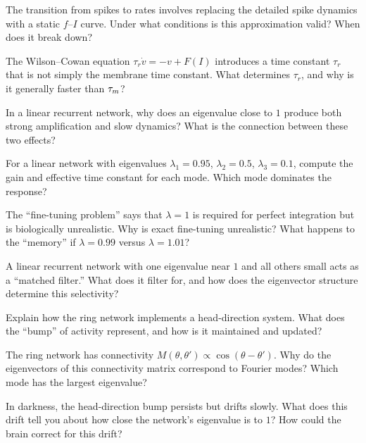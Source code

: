 \begin{conceptquestions}
  \item The transition from spikes to rates involves replacing the detailed spike dynamics with a static $f$--$I$ curve. Under what conditions is this approximation valid? When does it break down?

  \item The Wilson--Cowan equation $\tau_r \dot{v} = -v + F(I)$ introduces a time constant $\tau_r$ that is not simply the membrane time constant. What determines $\tau_r$, and why is it generally faster than $\tau_m$?

  \item In a linear recurrent network, why does an eigenvalue close to $1$ produce both strong amplification and slow dynamics? What is the connection between these two effects?

  \item For a linear network with eigenvalues $\lambda_1 = 0.95$, $\lambda_2 = 0.5$, $\lambda_3 = 0.1$, compute the gain and effective time constant for each mode. Which mode dominates the response?

  \item The ``fine-tuning problem'' says that $\lambda = 1$ is required for perfect integration but is biologically unrealistic. Why is exact fine-tuning unrealistic? What happens to the ``memory'' if $\lambda = 0.99$ versus $\lambda = 1.01$?

  \item A linear recurrent network with one eigenvalue near $1$ and all others small acts as a ``matched filter.'' What does it filter for, and how does the eigenvector structure determine this selectivity?

  \item Explain how the ring network implements a head-direction system. What does the ``bump'' of activity represent, and how is it maintained and updated?

  \item The ring network has connectivity $M(\theta, \theta') \propto \cos(\theta - \theta')$. Why do the eigenvectors of this connectivity matrix correspond to Fourier modes? Which mode has the largest eigenvalue?

  \item In darkness, the head-direction bump persists but drifts slowly. What does this drift tell you about how close the network's eigenvalue is to $1$? How could the brain correct for this drift?


\end{conceptquestions}
